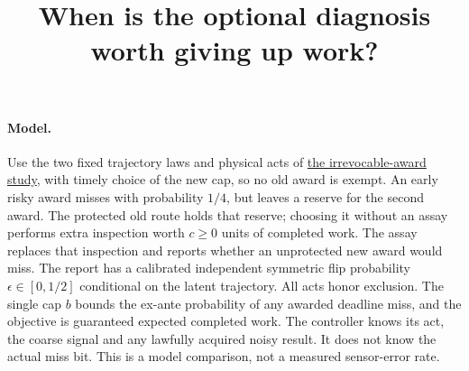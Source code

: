 \documentclass[11pt]{article}
\title{When is the optional diagnosis worth giving up work?}
\date{}
\begin{document}
\maketitle

\paragraph{Model.}
Use the two fixed trajectory laws and physical acts of \href{https://github.com/eternal-november/eos-research-programmes/pull/422}{the irrevocable-award study}, with timely choice of the new cap, so no old award is exempt. An early risky award misses with probability $1/4$, but leaves a reserve for the second award. The protected old route holds that reserve; choosing it without an assay performs extra inspection worth $c\geq0$ units of completed work. The assay replaces that inspection and reports whether an unprotected new award would miss. The report has a calibrated independent symmetric flip probability $\epsilon\in[0,1/2]$ conditional on the latent trajectory. All acts honor exclusion. The single cap $b$ bounds the ex-ante probability of any awarded deadline miss, and the objective is guaranteed expected completed work. The controller knows its act, the coarse signal and any lawfully acquired noisy result. It does not know the actual miss bit. This is a model comparison, not a measured sensor-error rate.
\end{document}
